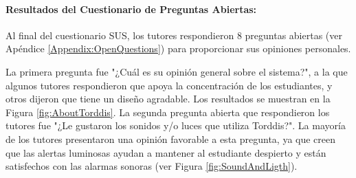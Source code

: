 \documentclass[a4paper,fleqn]{cas-sc}
\begin{document}
					\paragraph{\textbf{Resultados del Cuestionario de Preguntas Abiertas:}}
						Al final del cuestionario SUS, los tutores respondieron 8 preguntas abiertas (ver Apéndice \ref{Appendix:OpenQuestions}) para proporcionar sus opiniones personales.
						
						La primera pregunta fue "¿Cuál es su opinión general sobre el sistema?", a la que algunos tutores respondieron que apoya la concentración de los estudiantes, y otros dijeron que tiene un diseño agradable. Los resultados se muestran en la Figura \ref{fig:AboutTorddis}. La segunda pregunta abierta que respondieron los tutores fue "¿Le gustaron los sonidos y/o luces que utiliza Torddis?". La mayoría de los tutores presentaron una opinión favorable a esta pregunta, ya que creen que las alertas luminosas ayudan a mantener al estudiante despierto y están satisfechos con las alarmas sonoras (ver Figura \ref{fig:SoundAndLigth}).
						
\end{document}
